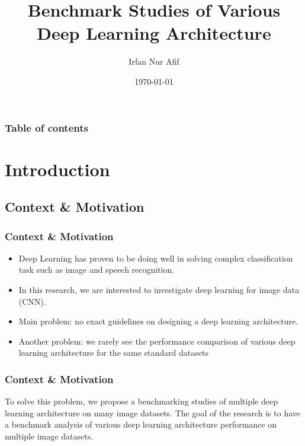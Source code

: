 \documentclass{beamer}
\begin{document}
\title{Benchmark Studies of Various Deep Learning Architecture}  
\author{Irfan Nur Afif}
\date{\today} 


\begin{frame}
\titlepage
\end{frame}

\begin{frame}\frametitle{Table of contents}\tableofcontents
\end{frame} 


\section{Introduction} 
\subsection{Context \& Motivation }
\begin{frame}\frametitle{Context \& Motivation}
\begin{itemize}
	\item Deep Learning has proven to be doing well in solving complex classification task such as image and speech recognition.
	\item In this research, we are interested to investigate deep learning for image data (CNN).
	\item Main problem: no exact guidelines on designing a deep learning architecture. 
	\item Another problem: we rarely see the performance comparison of various deep learning architecture for the same standard datasets
\end{itemize}
\end{frame}
\begin{frame}\frametitle{Context \& Motivation}
   
To solve this problem, we propose a benchmarking studies of multiple deep learning architecture on many image datasets. The goal of the research is to have a benchmark analysis of various deep learning architecture performance on multiple image datasets.
\end{frame}
\end{document}
